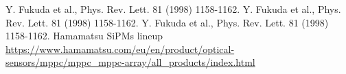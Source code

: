 \documentclass[a4paper,11pt,titlepage,oneside]{book}	%
\begin{document}
	
	\begin{frontespizio}
		\Punteggiatura{}
	\end{frontespizio}
	
	\begin{frontmatter}
		\tableofcontents
		
		
		
	\end{frontmatter}
	
	\begin{mainmatter}
		
		
		
		
		
		
		

		
		
		
		
	\end{mainmatter}
	
	\begin{backmatter}
		
		
		\begin{thebibliography}{99}
			
			
			 Y. Fukuda et al., Phys. Rev. Lett. 81 (1998) 1158-1162.
			 Y. Fukuda et al., Phys. Rev. Lett. 81 (1998) 1158-1162.
			 Y. Fukuda et al., Phys. Rev. Lett. 81 (1998) 1158-1162.
			 Hamamatsu SiPMs lineup \url{https://www.hamamatsu.com/eu/en/product/optical-sensors/mppc/mppc_mppc-array/all_products/index.html}		
		\end{thebibliography}
		
	\end{backmatter}
	
	
\end{document}
